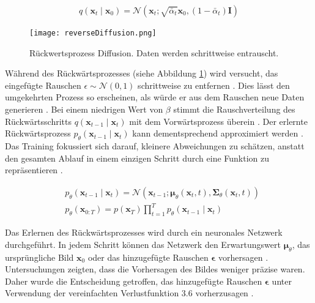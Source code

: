 \documentclass[
  a4paper,  %
  twoside,  %
  bibliography=totoc,
  headsepline,
  cleardoublepage=empty,
  parskip=half,
  draft=false
]{scrbook}
\begin{document}
\begin{equation}
    q\left(\mathbf{x}_t \mid \mathbf{x}_0\right)=\mathcal{N}\left(\mathbf{x}_t ; \sqrt{\bar{\alpha}_t} \mathbf{x}_0,\left(1-\bar{\alpha}_t\right) \mathbf{I}\right)
\end{equation}

\begin{figure}[h]
  \centering
  \texttt{[image: reverseDiffusion.png]}
  \caption[Rückwertsprozess Diffusion]{Rückwertsprozess Diffusion. Daten werden schrittweise entrauscht. \cite{machine_learning_at_berkeley_diffusion_2022}}
  \label{fig:reverseDiffusion}
\end{figure} 

Während des Rückwärtsprozesses (siehe Abbildung \ref{fig:reverseDiffusion}) wird versucht, das eingefügte Rauschen $\epsilon \sim \mathcal{N}(0,1)$ schrittweise zu entfernen \cite{machine_learning_at_berkeley_diffusion_2022}. Dies lässt den umgekehrten Prozess so erscheinen, als würde er aus dem Rauschen neue Daten generieren \cite{machine_learning_at_berkeley_diffusion_2022}. Bei einem niedrigen Wert von $\beta$ stimmt die Rauschverteilung des Rückwärtsschritts \( q\left(\mathbf{x}_{t-1} \mid \mathbf{x}_t\right) \) mit dem Vorwärtsprozess überein \cite{sohl-dickstein_deep_2015}. Der erlernte Rückwärtsprozess \( p_\theta\left(\mathbf{x}_{t-1} \mid \mathbf{x}_t\right) \) kann dementsprechend approximiert werden \cite{ho_denoising_2020, machine_learning_at_berkeley_diffusion_2022, nichol_improved_2021}. Das Training fokussiert sich darauf, kleinere Abweichungen zu schätzen, anstatt den gesamten Ablauf in einem einzigen Schritt durch eine Funktion zu repräsentieren \cite{sohl-dickstein_deep_2015}.


\begin{align}
& p_\theta\left(\mathbf{x}_{t-1} \mid \mathbf{x}_t\right)=\mathcal{N}\left(\mathbf{x}_{t-1} ; \boldsymbol{\mu}_\theta\left(\mathbf{x}_t, t\right), \boldsymbol{\Sigma}_\theta\left(\mathbf{x}_t, t\right)\right)\\
& p_\theta\left(\mathbf{x}_{0: T}\right)=p\left(\mathbf{x}_T\right) \prod_{t=1}^T p_\theta\left(\mathbf{x}_{t-1} \mid \mathbf{x}_t\right)
\end{align}

Das Erlernen des Rückwärtsprozesses wird durch ein neuronales Netzwerk durchgeführt. In jedem Schritt können das Netzwerk den Erwartungswert $\boldsymbol{\mu}_\theta$, das ursprüngliche Bild $\boldsymbol{x}_0$ oder das hinzugefügte Rauschen $\boldsymbol{\epsilon}$ vorhersagen \cite{ho_denoising_2020, nichol_improved_2021}. Untersuchungen zeigten, dass die Vorhersagen des Bildes weniger präzise waren. Daher wurde die Entscheidung getroffen, das hinzugefügte Rauschen $\boldsymbol{\epsilon}$ unter Verwendung der vereinfachten Verlustfunktion 3.6 vorherzusagen \cite{ho_denoising_2020}.
\end{document}
